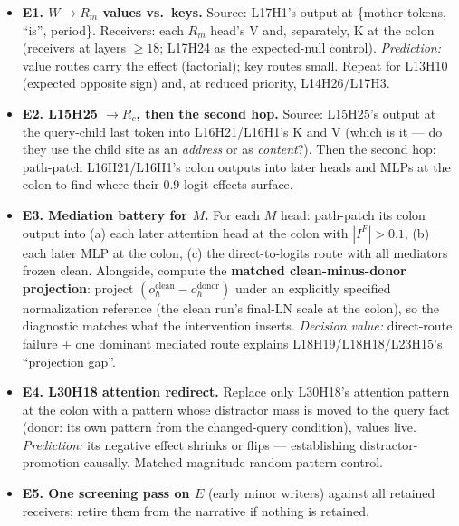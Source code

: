 \begin{itemize}[leftmargin=1.4em]
  \item \textbf{E1. $W\!\to\!R_m$ values vs.\ keys.} Source: L17H1's output at
        \{mother tokens, ``is'', period\}. Receivers: each $R_m$ head's V and,
        separately, K at the colon (receivers at layers $\ge 18$; L17H24 as the
        expected-null control). \emph{Prediction:} value routes carry the effect
        (factorial); key routes small. Repeat for L13H10 (expected opposite sign) and,
        at reduced priority, L14H26/L17H3.
  \item \textbf{E2. L15H25 $\to R_c$, then the second hop.} Source: L15H25's output at
        the query-child last token into L16H21/L16H1's K and V (which is it --- do they
        use the child site as an \emph{address} or as \emph{content}?). Then the second
        hop: path-patch L16H21/L16H1's colon outputs into later heads and MLPs at the
        colon to find where their 0.9-logit effects surface.
  \item \textbf{E3. Mediation battery for $M$.} For each $M$ head: path-patch its colon
        output into (a) each later attention head at the colon with $|I^F|>0.1$,
        (b) each later MLP at the colon, (c) the direct-to-logits route with all
        mediators frozen clean. Alongside, compute the \textbf{matched clean-minus-donor
        projection}: project $(o_h^{\mathrm{clean}}-o_h^{\mathrm{donor}})$ under an
        explicitly specified normalization reference (the clean run's final-LN scale at
        the colon), so the diagnostic matches what the intervention inserts.
        \emph{Decision value:} direct-route failure + one dominant mediated route
        explains L18H19/L18H18/L23H15's ``projection gap''.
  \item \textbf{E4. L30H18 attention redirect.} Replace only L30H18's attention pattern
        at the colon with a pattern whose distractor mass is moved to the query fact
        (donor: its own pattern from the changed-query condition), values live.
        \emph{Prediction:} its negative effect shrinks or flips --- establishing
        distractor-promotion causally. Matched-magnitude random-pattern control.
  \item \textbf{E5. One screening pass on $E$} (early minor writers) against all
        retained receivers; retire them from the narrative if nothing is retained.
\end{itemize}


